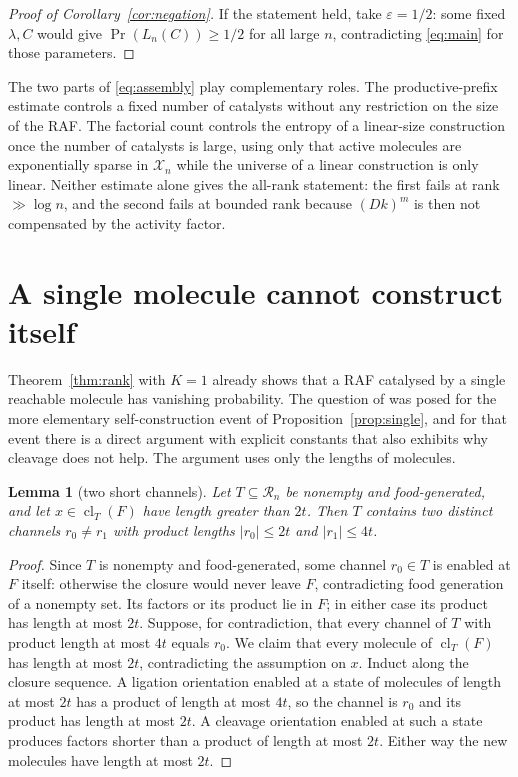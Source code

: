 \documentclass[11pt,a4paper]{article}
\theoremstyle{plain}
\newtheorem{lemma}[theorem]{Lemma}
\theoremstyle{definition}
\theoremstyle{remark}
\newcommand{\cl}{\operatorname{cl}}
\newcommand{\cR}{\mathcal R}
\newcommand{\cX}{\mathcal X}
\begin{document}
\begin{proof}[Proof of Corollary~\ref{cor:negation}]
If the statement held, take $\varepsilon=1/2$: some fixed $\lambda,C$ would give $\Pr(L_n(C))\ge1/2$ for all large $n$, contradicting \eqref{eq:main} for those parameters.
\end{proof}

The two parts of \eqref{eq:assembly} play complementary roles. The productive-prefix estimate controls a fixed number of catalysts without any restriction on the size of the RAF. The factorial count controls the entropy of a linear-size construction once the number of catalysts is large, using only that active molecules are exponentially sparse in $\cX_n$ while the universe of a linear construction is only linear. Neither estimate alone gives the all-rank statement: the first fails at rank $\gg\log n$, and the second fails at bounded rank because $(Dk)^m$ is then not compensated by the activity factor.

\section{A single molecule cannot construct itself}\label{sec:single}

Theorem~\ref{thm:rank} with $K=1$ already shows that a RAF catalysed by a single reachable molecule has vanishing probability. The question of \cite{hordijk2016variable} was posed for the more elementary self-construction event of Proposition~\ref{prop:single}, and for that event there is a direct argument with explicit constants that also exhibits why cleavage does not help. The argument uses only the lengths of molecules.

\begin{lemma}[two short channels]\label{lem:twofrontier}
Let $T\subseteq\cR_n$ be nonempty and food-generated, and let $x\in\cl_T(F)$ have length greater than $2t$. Then $T$ contains two distinct channels $r_0\ne r_1$ with product lengths $|r_0|\le2t$ and $|r_1|\le4t$.
\end{lemma}

\begin{proof}
Since $T$ is nonempty and food-generated, some channel $r_0\in T$ is enabled at $F$ itself: otherwise the closure would never leave $F$, contradicting food generation of a nonempty set. Its factors or its product lie in $F$; in either case its product has length at most $2t$. Suppose, for contradiction, that every channel of $T$ with product length at most $4t$ equals $r_0$. We claim that every molecule of $\cl_T(F)$ has length at most $2t$, contradicting the assumption on $x$. Induct along the closure sequence. A ligation orientation enabled at a state of molecules of length at most $2t$ has a product of length at most $4t$, so the channel is $r_0$ and its product has length at most $2t$. A cleavage orientation enabled at such a state produces factors shorter than a product of length at most $2t$. Either way the new molecules have length at most $2t$.
\end{proof}
\end{document}
